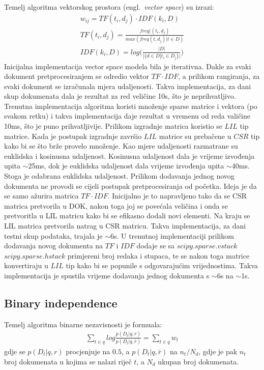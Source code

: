 \documentclass[a4paper,12pt]{article}
\newcommand{\engl}[1]{(engl.~\emph{#1})}
\begin{document}
Temelj algoritma vektorskog prostora \engl{vector space} su izrazi:
\begin{align}
w_{ij} = TF(t_i , d_j) \cdot IDF(k_i , D) \\
TF(t_i , d_j) = \frac{freq((t_i , d_j)}{max(freq(t, d_j) | t \in D)} \\
IDF(k_i, D) = log\Big(\frac{|D|}{|\{d \in D | t_i \in D_j\}|}\Big)
\end{align}
Inicijalna implementacija vector space modela bila je iterativna. Dakle za svaki dokument pretprocesiranjem se odredio vektor $TF \cdot IDF$, a prilikom rangiranja, za svaki dokument se izračunala mjera udaljenosti. Takva implementacija, za dani skup dokumenata dala je rezultat za red veličine 10s, što je neprihvatljivo. Trenutna implementacija algoritma koristi množenje sparse matrice i vektora (po svakom retku) i takva implementacija daje rezultat u vremenu od reda valičine 10ms, što je puno prihvatljivije. Prilikom izgradnje matrica koristio se $LIL$ tip matrice. Kada je postupak izgradnje završio $LIL$ matrice su prebačene u $CSR$ tip kako bi se što brže provelo množenje. Kao mjere udaljenosti razmatrane su euklidska i kosinusna udaljenost. Kosinusna udaljenost dala je vrijeme izvođenja upita $\sim$25ms, dok je euklidska udaljenost dala vrijeme izvođenja upita $\sim$40ms. Stoga je odabrana euklidska udaljenost. Prilikom dodavanja jednog novog dokumenta ne provodi se cijeli postupak pretprocesiranja od početka. Ideja je da se samo ažurira matrica $TF \cdot IDF$. Inicijalno je to napravljeno tako da se CSR matrica pretvorila u DOK, nakon toga joj se povećala veličina i onda se pretvoritla u LIL matricu kako bi se efikasno dodali novi elementi. Na kraju se LIL matrica pretvorila natrag u CSR matricu. Takva implementacija, za dani testni skup podataka, trajala je $\sim$6s. U trenutnoj implementaciji prilikom dodavanja novog dokumenta na $TF$ i $IDF$ dodaje se sa $scipy.sparse.vstack$ $scipy.sparse.hstack$ primjereni broj redaka i stupaca, te se nakon toga matrice konvertiraju u $LIL$ tip kako bi se popunile s odgovarajućim vrijednostima. Takva implementacija je spustila vrijeme dodavanja jednog dokumenta s $\sim$6s na $\sim$1s.

\subsection{Binary independence}

Temelj algoritma binarne nezavisnosti je formuala:
\begin{align}
\sum_{t \in q} log \frac{p(D_t|q, r)}{p(D_t|q, \bar r)} = \sum_{t \in q} w_t
\end{align}
gdje se $p(D_t|q, r)$ procjenjuje na $0.5$, a $p(D_t|q, \bar r)$ na $n_t / N_d$, gdje je pak $n_t$ broj dokumenata u kojima se nalazi riječ $t$, a $N_d$ ukupan broj dokumenata.
\end{document}
